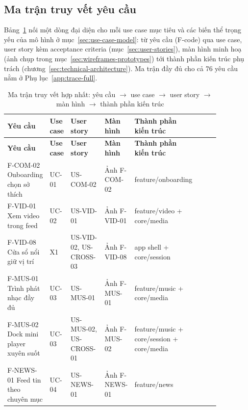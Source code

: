 \subsection{Ma trận truy vết yêu cầu}
\label{sec:traceability}

Bảng~\ref{tab:trace-matrix} nối một dòng đại diện cho mỗi use case mục tiêu và các biến thể trọng yếu của mô hình ở mục~\ref{sec:use-case-model}: từ yêu cầu (F-code) qua use case, user story kèm acceptance criteria (mục~\ref{sec:user-stories}), màn hình minh hoạ (ảnh chụp trong mục~\ref{sec:wireframes-prototypes}) tới thành phần kiến trúc phụ trách (chương~\ref{sec:technical-architecture}). Ma trận đầy đủ cho cả 76 yêu cầu nằm ở Phụ lục~\ref{app:trace-full}.

\begingroup
\small
\renewcommand{\arraystretch}{1.15}
\setlength{\tabcolsep}{3pt}
\begin{longtable}{>{\RaggedRight\arraybackslash}p{0.13\linewidth}>{\RaggedRight\arraybackslash}p{0.09\linewidth}>{\RaggedRight\arraybackslash}p{0.17\linewidth}>{\RaggedRight\arraybackslash}p{0.09\linewidth}>{\RaggedRight\arraybackslash}p{0.22\linewidth}>{\RaggedRight\arraybackslash}p{0.16\linewidth}}
\caption{Ma trận truy vết hợp nhất: yêu cầu $\rightarrow$ use case $\rightarrow$ user story $\rightarrow$ màn hình $\rightarrow$ thành phần kiến trúc}
\label{tab:trace-matrix}\\
\toprule
\textbf{Yêu cầu} & \textbf{Use case} & \textbf{User story} & \textbf{Màn hình} & \textbf{Thành phần kiến trúc} \\
\midrule
\endfirsthead
\toprule
\textbf{Yêu cầu} & \textbf{Use case} & \textbf{User story} & \textbf{Màn hình} & \textbf{Thành phần kiến trúc} \\
\midrule
\endhead
\bottomrule
\endfoot
F-COM-02 Onboarding chọn sở thích & UC-01 & US-COM-02 & Ảnh F-COM-02 & feature/onboarding \\
F-VID-01 Xem video trong feed & UC-02 & US-VID-01 & Ảnh F-VID-01 & feature/video + core/media \\
F-VID-08 Cửa sổ nổi giữ vị trí & X1 & US-VID-02, US-CROSS-03 & Ảnh F-VID-08 & app shell + core/session \\
F-MUS-01 Trình phát nhạc đầy đủ & UC-03 & US-MUS-01 & Ảnh F-MUS-01 & feature/music + core/media \\
F-MUS-02 Dock mini player xuyên suốt & UC-03 & US-MUS-02, US-CROSS-01 & Ảnh F-MUS-02 & feature/music + core/session + core/media \\
F-NEWS-01 Feed tin theo chuyên mục & UC-04 & US-NEWS-01 & Ảnh F-NEWS-01 & feature/news \\

\end{longtable}
